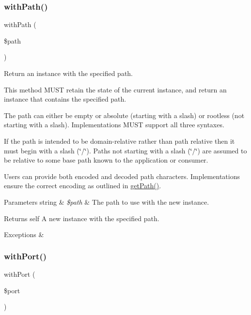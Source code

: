 \subsubsection{\texorpdfstring{with\+Path()}{withPath()}}
{\footnotesize\ttfamily with\+Path (\begin{DoxyParamCaption}\item[{}]{\$path }\end{DoxyParamCaption})}

Return an instance with the specified path.

This method M\+U\+ST retain the state of the current instance, and return an instance that contains the specified path.

The path can either be empty or absolute (starting with a slash) or rootless (not starting with a slash). Implementations M\+U\+ST support all three syntaxes.

If the path is intended to be domain-\/relative rather than path relative then it must begin with a slash (\char`\"{}/\char`\"{}). Paths not starting with a slash (\char`\"{}/\char`\"{}) are assumed to be relative to some base path known to the application or consumer.

Users can provide both encoded and decoded path characters. Implementations ensure the correct encoding as outlined in \mbox{\hyperlink{class_pes_1_1_http_1_1_uri_a30c5c67b2bf8e2e2ccc7e361faa20afe}{get\+Path()}}.


\begin{DoxyParams}[1]{Parameters}
string & {\em \$path} & The path to use with the new instance. \\
\hline
\end{DoxyParams}
\begin{DoxyReturn}{Returns}
self A new instance with the specified path. 
\end{DoxyReturn}

\begin{DoxyExceptions}{Exceptions}
{\em } & \\
\hline
\end{DoxyExceptions}
\mbox{\label{class_pes_1_1_http_1_1_uri_aec8b0c6721da90f5fb19135ed6832f35}} 
\subsubsection{\texorpdfstring{with\+Port()}{withPort()}}
{\footnotesize\ttfamily with\+Port (\begin{DoxyParamCaption}\item[{}]{\$port }\end{DoxyParamCaption})}

